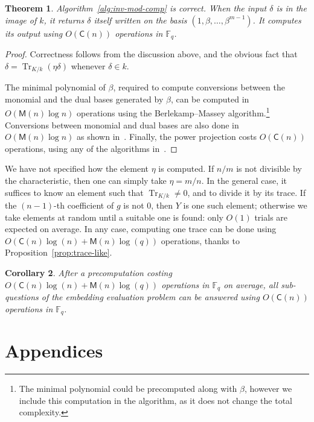 \documentclass[12pt]{article}
\theoremstyle{plain}
\newtheorem{theorem}{Theorem}
\newtheorem{corollary}[theorem]{Corollary}
\theoremstyle{definition}
\DeclareMathOperator{\trace}{Tr} %
\def\F{\ensuremath{\mathbb{F}}}
\def\MM{\ensuremath{\mathsf{M}}}
\def\CC{\ensuremath{\mathsf{C}}}
\newcounter{algorithm}
\begin{document}
\begin{theorem}
  Algorithm~\ref{alg:inv-mod-comp} is correct. %
  When the input $\delta$ is in the image of $k$, it returns $\delta$
  itself written on the basis $(1,\beta,\dots,\beta^{m-1})$. %
  It computes its output using $O(\CC(n))$ operations in $\F_q$.
\end{theorem}
\begin{proof}
  Correctness follows from the discussion above, and the obvious fact
  that $\delta=\trace_{K/k}(\eta\delta)$ whenever $\delta\in k$.

  The minimal polynomial of $\beta$, required to compute conversions
  between the monomial and the dual bases generated by $\beta$, can be
  computed in $O(\MM(n)\log n)$ operations using the Berlekamp--Massey
  algorithm.\footnote{The minimal polynomial could be precomputed
    along with $\beta$, however we include this computation in the
    algorithm, as it does not change the total complexity.} %
  Conversions between monomial and dual bases are also done in
  $O(\MM(n)\log n)$ as shown in~\cite[\S~3]{DeDoSc2014}. %
  Finally, the power projection costs $O(\CC(n))$ operations, using
  any of the algorithms in~\cite{shoup95,kedlaya+umans08}.
\end{proof}

We have not specified how the element $\eta$ is computed. %
If $n/m$ is not divisible by the characteristic, then one can simply
take $\eta=m/n$. %
In the general case, it suffices to know an element such that
$\trace_{K/k}\ne0$, and to divide it by its trace. %
If the $(n-1)$-th coefficient of $g$ is not $0$, then $Y$ is one such
element; otherwise we take elements at random until a suitable one is
found: only $O(1)$ trials are expected on average. %
In any case, computing one trace can be done using
$O(\CC(n)\log(n)+\MM(n)\log(q))$ operations, thanks to
Proposition~\ref{prop:trace-like}.

\begin{corollary}
  After a precomputation costing $O(\CC(n)\log(n)+\MM(n)\log(q))$
  operations in $\F_q$ on average, all sub-questions of the
  \emph{embedding evaluation problem} can be answered using
  $O(\CC(n))$ operations in $\F_q$.
\end{corollary}



\appendix
\part*{Appendices}
\end{document}
